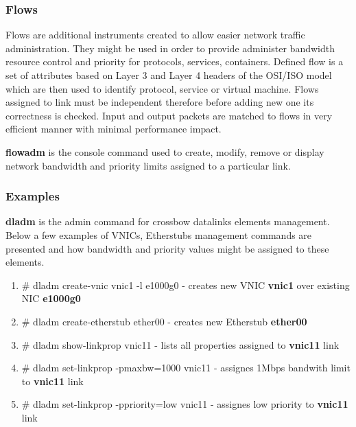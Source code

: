 \documentclass[11pt]{book}
\begin{document}
                \subsubsection{Flows}

                        Flows are additional instruments created to allow easier network traffic administration. They might be used in order to provide administer bandwidth resource control and priority for protocols, services, containers.
                        Defined flow is a set of attributes based on Layer 3 and Layer 4 headers of the OSI/ISO model which are then used to identify protocol, service or virtual machine. 
                        Flows assigned to link must be independent therefore before adding new one its correctness is checked. Input and output packets are matched to flows in very efficient 
                        manner with minimal performance impact.

                        \medskip

                        \textbf{flowadm} is the console command used to create, modify, remove or display network bandwidth and priority limits assigned to a particular link. 


                \subsubsection{Examples}

                        \textbf{dladm} is the admin command for crossbow datalinks elements management. Below a few examples of VNICs, Etherstubs management commands are presented and how
                        bandwidth and priority values might be assigned to these elements.

                        \begin{enumerate}
                        	\item{\# dladm create-vnic vnic1 -l e1000g0 - creates new VNIC \textbf{vnic1} over existing NIC \textbf{e1000g0}}
        	                \item{\# dladm create-etherstub ether00 - creates new Etherstub \textbf{ether00}}
                        	\item{\# dladm show-linkprop vnic11 - lists all properties assigned to \textbf{vnic11} link}
                        	\item{\# dladm set-linkprop -pmaxbw=1000 vnic11 - assignes 1Mbps bandwith limit to \textbf{vnic11} link}
                        	\item{\# dladm set-linkprop -ppriority=low vnic11 - assignes low priority to \textbf{vnic11} link}
                        \end{enumerate}
\end{document}
